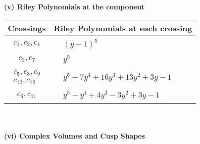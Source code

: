 \documentclass[1p]{elsarticle_modified}
\theoremstyle{definition}
\begin{document}
\newpage\renewcommand{\arraystretch}{1}
\flushleft \textbf{(v) Riley Polynomials at the component}\newline \\
\begin{tabular}{m{50pt}|m{274pt}}
Crossings & \hspace{64pt}Riley Polynomials at each crossing \\
\hline $$\begin{aligned}c_{1},c_{2},c_{4}\end{aligned}$$&$\begin{aligned}
&(y-1)^5
\end{aligned}$\\
\hline $$\begin{aligned}c_{3},c_{7}\end{aligned}$$&$\begin{aligned}
&y^5
\end{aligned}$\\
\hline $$\begin{aligned}c_{5},c_{8},c_{9}\\c_{10},c_{12}\end{aligned}$$&$\begin{aligned}
&y^5+7 y^4+16 y^3+13 y^2+3 y-1
\end{aligned}$\\
\hline $$\begin{aligned}c_{6},c_{11}\end{aligned}$$&$\begin{aligned}
&y^5- y^4+4 y^3-3 y^2+3 y-1
\end{aligned}$\\
\hline
\end{tabular}\\~\\
\newpage\flushleft \textbf{(vi) Complex Volumes and Cusp Shapes}
\end{document}
